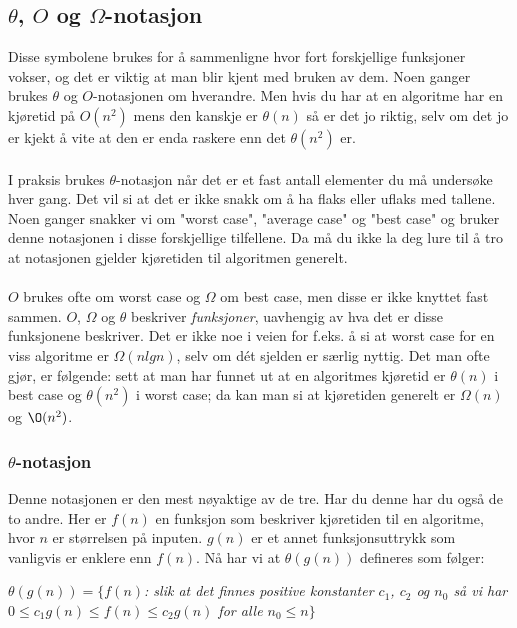 \subsection{$\theta$, $O$ og $\Omega$-notasjon}
Disse symbolene brukes for å sammenligne hvor fort forskjellige funksjoner vokser, og det er viktig at man blir kjent med bruken av dem. Noen ganger brukes $\theta$ og $O$-notasjonen om hverandre. Men hvis du har at en algoritme har en kjøretid på $O(n^2)$ mens den kanskje er $\theta(n)$ så er det jo riktig, selv om det jo er kjekt å vite at den er enda raskere enn det $\theta(n^2)$ er.
\\\\
I praksis brukes $\theta$-notasjon når det er et fast antall elementer du må undersøke hver gang. Det vil si at det er ikke snakk om å ha flaks eller uflaks med tallene. Noen ganger snakker vi om "worst case", "average case" og "best case" og bruker denne notasjonen i disse forskjellige tilfellene. Da må du ikke la deg lure til å tro at notasjonen gjelder kjøretiden til algoritmen generelt.
\\\\
$O$ brukes ofte om worst case og $\Omega$ om best case, men disse er ikke knyttet fast sammen. $O$, $\Omega$ og $\theta$ beskriver \textit{funksjoner}, uavhengig av hva det er disse funksjonene beskriver. Det er ikke noe i veien for f.eks. å si at worst case for en viss algoritme er $\Omega(n lg n)$, selv om dét sjelden er særlig nyttig. Det man ofte gjør, er følgende: sett at man har funnet ut at en algoritmes kjøretid er $\theta(n)$ i best case og $\theta(n^2)$ i worst case; da kan man si at kjøretiden generelt er $\Omega(n)$ og $\O(n^2)$.

\subsubsection{$\theta$-notasjon}
Denne notasjonen er den mest nøyaktige av de tre. Har du denne har du også de to andre. Her er $f(n)$ en funksjon som beskriver kjøretiden til en algoritme, hvor $n$ er størrelsen på inputen. $g(n)$ er et annet funksjonsuttrykk som vanligvis er enklere enn $f(n)$. Nå har vi at $\theta(g(n))$ defineres som følger:

\begin{center}
\textit{$\theta(g(n)) = \{ f(n)$: slik at det finnes positive konstanter $c_1$, $c_2$ og $n_0$ så vi har $0 \leq c_1 g(n) \leq f(n) \leq c_2 g(n)$ for alle $n_0 \leq n \}$}
\end{center}

